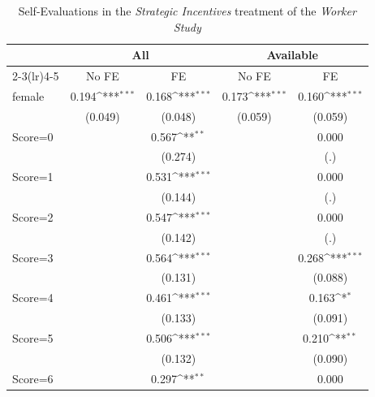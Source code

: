 \begin{table}[htbp]\centering
\def\sym#1{\ifmmode^{#1}\else\(^{#1}\)\fi}
\caption{Self-Evaluations in the \textit{Strategic Incentives} treatment of the \textit{Worker Study}}
\begin{tabular}{l*{4}{c}}
\hline\hline
                &\multicolumn{2}{c}{All}              &\multicolumn{2}{c}{Available}        \\\cmidrule(lr){2-3}\cmidrule(lr){4-5}
                &\multicolumn{1}{c}{No FE}&\multicolumn{1}{c}{FE}&\multicolumn{1}{c}{No FE}&\multicolumn{1}{c}{FE}\\
\hline
female          &    0.194\sym{***}&    0.168\sym{***}&    0.173\sym{***}&    0.160\sym{***}\\
                &  (0.049)         &  (0.048)         &  (0.059)         &  (0.059)         \\
Score=0         &                  &    0.567\sym{**} &                  &    0.000         \\
                &                  &  (0.274)         &                  &      (.)         \\
Score=1         &                  &    0.531\sym{***}&                  &    0.000         \\
                &                  &  (0.144)         &                  &      (.)         \\
Score=2         &                  &    0.547\sym{***}&                  &    0.000         \\
                &                  &  (0.142)         &                  &      (.)         \\
Score=3         &                  &    0.564\sym{***}&                  &    0.268\sym{***}\\
                &                  &  (0.131)         &                  &  (0.088)         \\
Score=4         &                  &    0.461\sym{***}&                  &    0.163\sym{*}  \\
                &                  &  (0.133)         &                  &  (0.091)         \\
Score=5         &                  &    0.506\sym{***}&                  &    0.210\sym{**} \\
                &                  &  (0.132)         &                  &  (0.090)         \\
Score=6         &                  &    0.297\sym{**} &                  &    0.000         \\

\end{tabular}
\end{table}
